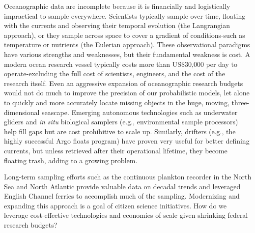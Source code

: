 Oceanographic data are incomplete because it is financially and logistically impractical to sample everywhere. Scientists typically sample over time, floating with the currents and observing their temporal evolution (the Langrangian approach), or they sample across space to cover a gradient of conditions-such as temperature or nutrients (the Eulerian approach). These observational paradigms have various strengths and weaknesses, but their fundamental weakness is cost. A modern ocean research vessel typically costs more than US\$30,000 per day to operate-excluding the full cost of scientists, engineers, and the cost of the research itself. Even an aggressive expansion of oceanographic research budgets would not do much to improve the precision of our probabilistic models, let alone to quickly and more accurately locate missing objects in the huge, moving, three-dimensional seascape. Emerging autonomous technologies such as underwater gliders and {\em in situ} biological samplers (e.g., environmental sample processors) help fill gaps but are cost prohibitive to scale up. Similarly, drifters (e.g., the highly successful Argo floats program) have proven very useful for better defining currents, but unless retrieved after their operational lifetime, they become floating trash, adding to a growing problem.

Long-term sampling efforts such as the continuous plankton recorder in the North Sea and North Atlantic \cite{warner_sampling_1994} provide valuable data on decadal trends and leveraged English Channel ferries to accomplish much of the sampling. Modernizing and expanding this approach is a goal of citizen science initiatives. How do we leverage cost-effective technologies and economies of scale given shrinking federal research budgets?
